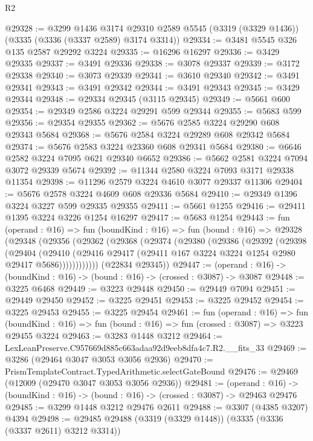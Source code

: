 \begin{lexlean}{R2}
\begin{coremodule}
@29328 := @3299
    @1436
    @3174
    @29310
    @2589
    @5545
    (@3319 (@3329 @1436))
    (@3335 (@3336 (@3337 @2589) @3174 @3314))
@29334 := @3481 @5545 @326 @135 @2587 @29292 @3224
@29335 := @16296 @16297
@29336 := @3429 @29335
@29337 := @3491 @29336
@29338 := @3078 @29337
@29339 := @3172 @29338
@29340 := @3073 @29339
@29341 := @3610 @29340
@29342 := @3491 @29341
@29343 := @3491 @29342
@29344 := @3491 @29343
@29345 := @3429 @29344
@29348 := @29334 @29345 (@3115 @29345)
@29349 := @5661 @600
@29354 := @29349 @2586 @3224 @29291 @599 @29344
@29355 := @5683 @599
@29356 := @29354 @29355
@29362 := @5676 @2585 @3224 @29290 @608 @29343 @5684
@29368 := @5676 @2584 @3224 @29289 @608 @29342 @5684
@29374 := @5676 @2583 @3224 @23360 @608 @29341 @5684
@29380 := @6646 @2582 @3224 @7095 @621 @29340 @6652
@29386 := @5662 @2581 @3224 @7094 @3072 @29339 @5674
@29392 := @11344 @2580 @3224 @7093 @3171 @29338 @11354
@29398 := @11296 @2579 @3224 @4610 @3077 @29337 @11306
@29404 := @5676 @2578 @3224 @4609 @608 @29336 @5684
@29410 := @29349 @1396 @3224 @3227 @599 @29335 @29355
@29411 := @5661 @1255
@29416 := @29411 @1395 @3224 @3226 @1254 @16297
@29417 := @5683 @1254
@29443 := fun (operand : @16) =>
  fun (boundKind : @16) =>
  fun (bound : @16) =>
  @29328
    (@29348
      (@29356
        (@29362
          (@29368
            (@29374
              (@29380
                (@29386
                  (@29392
                    (@29398
                      (@29404
                        (@29410
                          (@29416
                            @29417
                            (@29411 @167 @3224 @3224 @1254 @2980 @29417 @5686))))))))))))
      (@22834 @29345))
@29447 := (operand : @16) -> (boundKind : @16) -> (bound : @16) -> (crossed : @3087) -> @3087
@29448 := @3225 @6468
@29449 := @3223 @29448
@29450 := @29449 @7094
@29451 := @29449 @29450
@29452 := @3225 @29451
@29453 := @3225 @29452
@29454 := @3225 @29453
@29455 := @3225 @29454
@29461 := fun (operand : @16) =>
  fun (boundKind : @16) => fun (bound : @16) => fun (crossed : @3087) => @3223 @29455 @3224
@29463 := @3283 @1448 @3212
@29464 := LexLeanPreserve.C957669d885c663adaa92d9eeb8dfa4c7.R2.__fits_33
@29469 := @3286 (@29464 @3047 @3053 @3056 @2936)
@29470 := PrismTemplateContract.TypedArithmetic.selectGateBound
@29476 := @29469 (@12009 (@29470 @3047 @3053 @3056 @2936))
@29481 := (operand : @16) ->
  (boundKind : @16) -> (bound : @16) -> (crossed : @3087) -> @29463 @29476
@29485 := @3299 @1448 @3212 @29476 @2611
@29488 := @3307 (@4385 @3207) @4394
@29498 := @29485 @29488 (@3319 (@3329 @1448)) (@3335 (@3336 (@3337 @2611) @3212 @3314))

\end{coremodule}
\end{lexlean}
